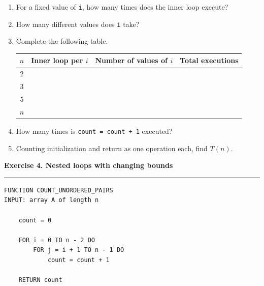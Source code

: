 \documentclass[11pt,a4paper]{article}
\newcommand{\exercise}[1]{%
  \vspace{0.7em}
  {\large\bfseries\color{ForestGreen}#1}
  \vspace{0.2em}
  \hrule
  \vspace{0.5em}
}
\begin{document}
\begin{enumerate}
    \item For a fixed value of \texttt{i}, how many times does the inner loop execute?

    \item How many different values does \texttt{i} take?

    \item Complete the following table.

    \begin{center}
    \renewcommand{\arraystretch}{1.35}
    \begin{tabular}{c|c|c|c}
        \toprule
        $n$ & Inner loop per $i$ & Number of values of $i$ & Total executions \\
        \midrule
        $2$ & & & \\
        $3$ & & & \\
        $5$ & & & \\
        $n$ & & & \\
        \bottomrule
    \end{tabular}
    \end{center}

    \item How many times is \texttt{count = count + 1} executed?

    \item Counting initialization and return as one operation each, find $T(n)$.
\end{enumerate}

\exercise{Exercise 4. Nested loops with changing bounds}

\begin{lstlisting}[style=pseudo]
FUNCTION COUNT_UNORDERED_PAIRS
INPUT: array A of length n

    count = 0

    FOR i = 0 TO n - 2 DO
        FOR j = i + 1 TO n - 1 DO
            count = count + 1

    RETURN count
\end{lstlisting}
\end{document}
